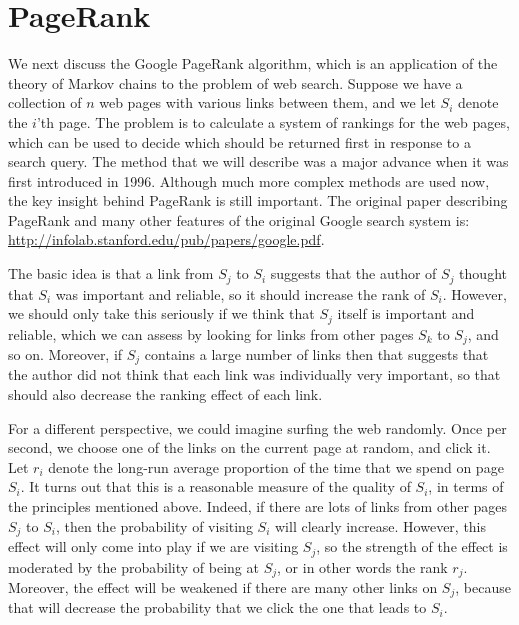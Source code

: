 \documentclass[reqno]{amsart}
\theoremstyle{definition}
\begin{document}
\section{PageRank}

We next discuss the Google PageRank algorithm, which is an application
of the theory of Markov chains to the problem of web search.  Suppose
we have a collection of $n$ web pages with various links between them,
and we let $S_i$ denote the $i$'th page.  The problem is to calculate
a system of rankings for the web pages, which can be used to decide
which should be returned first in response to a search query.  The
method that we will describe was a major advance when it was first
introduced in 1996.  Although much more complex methods are used now,
the key insight behind PageRank is still important.  The original
paper describing PageRank and many other features of the original
Google search system is:\\
\url{http://infolab.stanford.edu/pub/papers/google.pdf}.

\medskip

The basic idea is that a link from $S_j$ to $S_i$ suggests that the
author of $S_j$ thought that $S_i$ was important and reliable, so it
should increase the rank of $S_i$.  However, we should only take this
seriously if we think that $S_j$ itself is important and reliable,
which we can assess by looking for links from other pages $S_k$ to
$S_j$, and so on.  Moreover, if $S_j$ contains a large number of links
then that suggests that the author did not think that each link was
individually very important, so that should also decrease the ranking
effect of each link.  

For a different perspective, we could imagine surfing the web
randomly.  Once per second, we choose one of the links on the current
page at random, and click it.  Let $r_i$ denote the long-run average
proportion of the time that we spend on page $S_i$.  It turns out that
this is a reasonable measure of the quality of $S_i$, in terms of the
principles mentioned above.  Indeed, if there are lots of links from
other pages $S_j$ to $S_i$, then the probability of visiting $S_i$
will clearly increase.  However, this effect will only come into play
if we are visiting $S_j$, so the strength of the effect is moderated
by the probability of being at $S_j$, or in other words the rank
$r_j$.  Moreover, the effect will be weakened if there are many other
links on $S_j$, because that will decrease the probability that we
click the one that leads to $S_i$.  
\end{document}
